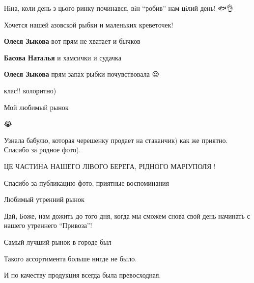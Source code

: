  
 
 
 
 

\qqSecCmt


Нiна, коли день з цього ринку починався, вiн \enquote{робив} нам цiлий день! 🐟👌🍉


Хочется нашей азовской рыбки и маленьких креветочек!

\begin{itemize} %
\textbf{Олеся Зыкова} вот прям не хватает и бычков

\textbf{Басова Наталья} и хамсички и судачка

\textbf{Олеся Зыкова} прям запах рыбки почувствовала 😔
\end{itemize} %


клас!! колоритно)


Мой любимый рынок


😭


Узнала бабулю, которая черешенку продает на стаканчик) как же приятно. Спасибо за родное фото).


ЦЕ ЧАСТИНА НАШЕГО ЛІВОГО БЕРЕГА, РІДНОГО МАРІУПОЛЯ !


Спасибо за публикацию фото, приятные воспоминания


Любимый утренний рынок


Дай, Боже, нам дожить до того дня, когда мы сможем снова свой день начинать с нашего утреннего \enquote{Привоза}!


Самый лучший рынок в городе был

Такого ассортимента больше нигде не было.

И по качеству продукция всегда была превосходная.

